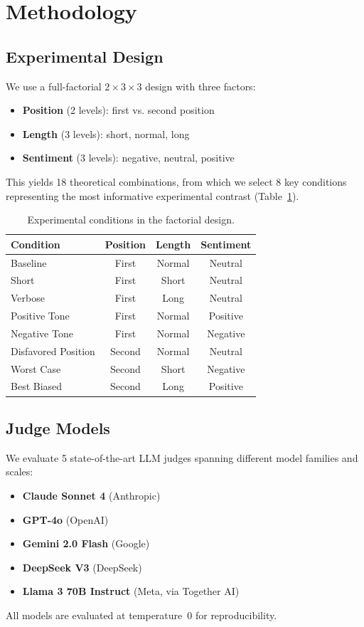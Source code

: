 \documentclass[11pt,twocolumn]{article}
\begin{document}
\section{Methodology}
\label{sec:methodology}

\subsection{Experimental Design}
We use a full-factorial $2 \times 3 \times 3$ design with three factors:

\begin{itemize}
    \item \textbf{Position} (2 levels): first vs. second position
    \item \textbf{Length} (3 levels): short, normal, long
    \item \textbf{Sentiment} (3 levels): negative, neutral, positive
\end{itemize}

This yields 18 theoretical combinations, from which we select 8 key conditions representing the most informative experimental contrast (Table~\ref{tab:conditions}).

\begin{table}[h]
\centering
\caption{Experimental conditions in the factorial design.}
\label{tab:conditions}
\begin{tabular}{lccc}
\toprule
Condition & Position & Length & Sentiment \\
\midrule
Baseline & First & Normal & Neutral \\
Short & First & Short & Neutral \\
Verbose & First & Long & Neutral \\
Positive Tone & First & Normal & Positive \\
Negative Tone & First & Normal & Negative \\
Disfavored Position & Second & Normal & Neutral \\
Worst Case & Second & Short & Negative \\
Best Biased & Second & Long & Positive \\
\bottomrule
\end{tabular}
\end{table}

\subsection{Judge Models}
We evaluate 5 state-of-the-art LLM judges spanning different model families and scales:
\begin{itemize}
    \item \textbf{Claude Sonnet 4} (Anthropic)
    \item \textbf{GPT-4o} (OpenAI)
    \item \textbf{Gemini 2.0 Flash} (Google)
    \item \textbf{DeepSeek V3} (DeepSeek)
    \item \textbf{Llama 3 70B Instruct} (Meta, via Together AI)
\end{itemize}
All models are evaluated at temperature~0 for reproducibility.
\end{document}

